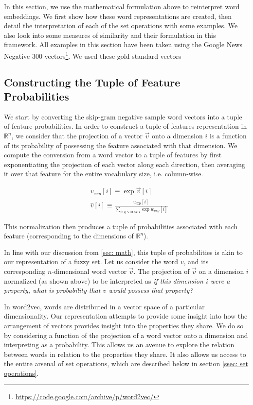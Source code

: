 \documentclass[11pt]{book}
\begin{document}
In this section, we use the mathematical formulation above to reinterpret word
embeddings. We first show how these word representations are created, then
detail the interpretation of each of the set operations with some examples. We
also look into some measures of similarity and their formulation in this
framework. All examples in this section have been taken using the Google News
Negative 300
vectors\footnote{\url{https://code.google.com/archive/p/word2vec/}}. We used
these gold standard vectors 

\subsection{Constructing the Tuple of Feature Probabilities} \label{ssec:
constructing}

We start by converting the skip-gram negative sample word vectors into a tuple
of feature probabilities. In order to construct a tuple of features
representation in $\mathbb{R}^n$, we consider that the projection of a vector
$\vec v$ onto a dimension $i$ is a function of its probability of possessing
the feature associated with that dimension.  We compute the conversion from a
word vector to a tuple of features by first exponentiating the projection of
each vector along each direction, then averaging it over that feature for the
entire vocabulary size, i.e. column-wise.

{\footnotesize \begin{align*} & v_{exp}[i] \equiv \exp \vec v[i] \\ & \hat v[i]
\equiv \frac{v_{\text{exp}}[i]}{\sum_{w \in \text{VOCAB}} \exp
w_{\text{exp}}[i]} \end{align*} }

This normalization then produces a tuple of probabilities associated with each
feature (corresponding to the dimensions of $\mathbb{R}^n$). 

In line with our discussion from \ref{sec: math}, this tuple of probabilities
is akin to our representation of a fuzzy set. Let us consider the word $v$, and
its corresponding $n$-dimensional word vector $\vec v$. The projection of $\vec
v$ on a dimension $i$ normalized (as shown above) to be interpreted as
\textit{if this dimension $i$ were a property, what is probability that $v$
would possess that property?} 

In word2vec, words are distributed in a vector space of a particular
dimensionality. Our representation attempts to provide some insight into how
the arrangement of vectors provides insight into the properties they share. We
do so by considering a function of the projection of a word vector onto a
dimension and interpreting as a probability. This allows us an avenue to
explore the relation between words in relation to the properties they share. It
also allows us access to the entire arsenal of set operations, which are
described below in section \ref{ssec: set operations}.
\end{document}
